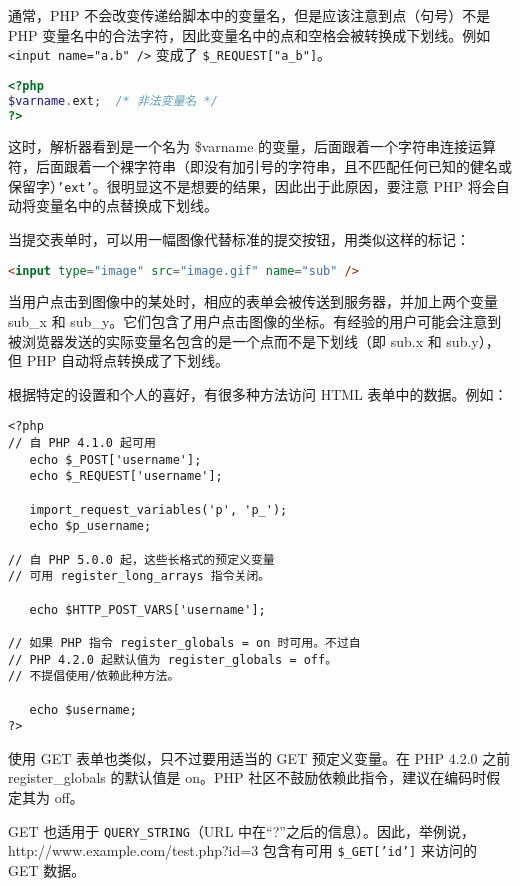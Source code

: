 通常，PHP 不会改变传递给脚本中的变量名，但是应该注意到点（句号）不是 PHP 变量名中的合法字符，因此变量名中的点和空格会被转换成下划线。例如 \texttt{<input name="a.b" />} 变成了 \texttt{\$\_REQUEST["a\_b"]}。

\begin{lstlisting}[language=PHP]
<?php
$varname.ext;  /* 非法变量名 */
?>
\end{lstlisting}

这时，解析器看到是一个名为 \$varname 的变量，后面跟着一个字符串连接运算符，后面跟着一个裸字符串（即没有加引号的字符串，且不匹配任何已知的健名或保留字）\texttt{'ext'}。很明显这不是想要的结果，因此出于此原因，要注意 PHP 将会自动将变量名中的点替换成下划线。

当提交表单时，可以用一幅图像代替标准的提交按钮，用类似这样的标记：
\begin{lstlisting}[language=HTML]
<input type="image" src="image.gif" name="sub" />
\end{lstlisting}

当用户点击到图像中的某处时，相应的表单会被传送到服务器，并加上两个变量 sub\_x 和 sub\_y。它们包含了用户点击图像的坐标。有经验的用户可能会注意到被浏览器发送的实际变量名包含的是一个点而不是下划线（即 sub.x 和 sub.y），但 PHP 自动将点转换成了下划线。




根据特定的设置和个人的喜好，有很多种方法访问 HTML 表单中的数据。例如：

\begin{verbatim}
<?php
// 自 PHP 4.1.0 起可用
   echo $_POST['username'];
   echo $_REQUEST['username'];
   
   import_request_variables('p', 'p_');
   echo $p_username;

// 自 PHP 5.0.0 起，这些长格式的预定义变量
// 可用 register_long_arrays 指令关闭。

   echo $HTTP_POST_VARS['username'];

// 如果 PHP 指令 register_globals = on 时可用。不过自
// PHP 4.2.0 起默认值为 register_globals = off。
// 不提倡使用/依赖此种方法。

   echo $username;
?>
\end{verbatim}

使用 GET 表单也类似，只不过要用适当的 GET 预定义变量。在 PHP 4.2.0 之前 register\_globals 的默认值是 on。PHP 社区不鼓励依赖此指令，建议在编码时假定其为 off。


GET 也适用于 \texttt{QUERY\_STRING}（URL 中在“?”之后的信息）。因此，举例说，http://www.example.com/test.php?id=3 包含有可用 \texttt{\$\_GET['id']} 来访问的 GET 数据。

